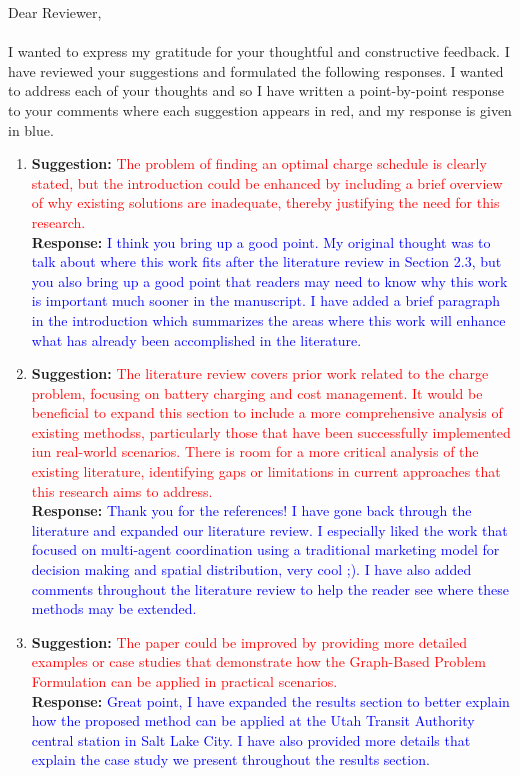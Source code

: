 \documentclass{article}
\newcommand\formatfeedback[2]
{%
	\textbf{Suggestion:} \textcolor{red}{#1} 
	\\[0.1in] \textbf{Response:} \textcolor{blue}{#2}
}
\begin{document}
\noindent Dear Reviewer, \\ \\
I wanted to express my gratitude for your thoughtful and constructive feedback. I have reviewed your suggestions and formulated the following responses. I wanted to address each of your thoughts and so I have written a point-by-point response to your comments where each suggestion appears in red, and my response is given in blue. 
\begin{enumerate}
	\item \formatfeedback{The problem of finding an optimal charge schedule is clearly stated, but the introduction could be enhanced by including a brief overview of why existing solutions are inadequate, thereby justifying the need for this research.}%
			                 {I think you bring up a good point.  My original thought was to talk about where this work fits after the literature review in Section 2.3, but you also bring up a good point that readers may need to know why this work is important much sooner in the manuscript.  I have added a brief paragraph in the introduction which summarizes the areas where this work will enhance what has already been accomplished in the literature.}
	\item \formatfeedback{The literature review covers prior work related to the charge problem, focusing on battery charging and cost management. It would be beneficial to expand this section to include a more comprehensive analysis of existing methodss, particularly those that have been successfully implemented iun real-world scenarios. There is room for a more critical analysis of the existing literature, identifying gaps or limitations in current approaches that this research aims to address.}
		             {Thank you for the references!  I have gone back through the literature and expanded our literature review.  I especially liked the work that focused on multi-agent coordination using a traditional marketing model for decision making and spatial distribution, very cool ;). I have also added comments throughout the literature review to help the reader see where these methods may be extended.}
	\item \formatfeedback{The paper could be improved by providing more detailed examples or case studies that demonstrate how the Graph-Based Problem Formulation can be applied in practical scenarios.}
		           {Great point, I have expanded the results section to better explain how the proposed method can be applied at the Utah Transit Authority central station in Salt Lake City.  I have also provided more details that explain the case study we present throughout the results section.}

\end{enumerate}
\end{document}
